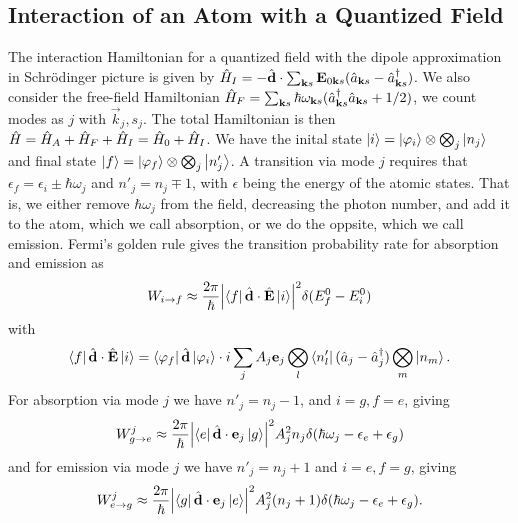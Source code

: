 \subsection{Interaction of an Atom with a Quantized Field} \label{sec:interaction_quantized}
The interaction Hamiltonian for a quantized field with the dipole approximation in Schrödinger picture is given by $\hat{H}_I = - \hat{\bm{\mathrm{d}}} \cdot \sum_{\bm{\mathrm{k}}s}\bm{\mathrm{E}}_{0 \bm{\mathrm{k}}s} (\hat{a}_{\bm{\mathrm{k}} s} - \hat{a}^\dagger_{\bm{\mathrm{k}} s})$. We also consider the free-field Hamiltonian $\hat{H}_F = \sum_{\bm{\mathrm{k}} s} \hbar\omega_{\bm{\mathrm{k}} s}(\hat{a}^\dagger_{\bm{\mathrm{k}} s}\hat{a}_{\bm{\mathrm{k}} s} + 1/2)$, we count modes as $j$ with $\vec{k}_j, s_j$. The total Hamiltonian is then $\hat{H} = \hat{H}_A + \hat{H}_F + \hat{H}_I = \hat{H}_0 + \hat{H}_I$. We have the inital state $\ket{i} = \ket{\varphi_i} \otimes \bigotimes_j \ket{n_j}$ and final state $\ket{f} = \ket{\varphi_f} \otimes \bigotimes_j \ket{n'_j}$. A transition via mode $j$ requires that $\epsilon_f = \epsilon_i \pm \hbar\omega_j$ and $n'_j = n_j \mp 1$, with $\epsilon$ being the energy of the atomic states. That is, we either remove $\hbar\omega_j$ from the field, decreasing the photon number, and add it to the atom, which we call absorption, or we do the oppsite, which we call emission. Fermi's golden rule gives the transition probability rate for absorption and emission as 
\begin{equation}
    W_{i \to f} \approx \frac{2\pi}{\hbar}\abs{\bra{f} \hat{\bm{\mathrm{d}}} \cdot \hat{\bm{\mathrm{E}}}\ket{i}}^2 \delta (E^0_f -E^0_i)
\end{equation}
with
\begin{equation}
    \bra{f} \dipole \cdot \hat{\vec E}\ket{i} = \bra{\varphi_f} \dipole\ket{\varphi_i} \cdot i \sum_j A_j \vec{e}_j \bigotimes_l\bra{n'_l} (\a_j - \ad_j)  \bigotimes_m\ket{n_m}.
\end{equation}
For absorption via mode $j$ we have $n'_j = n_j - 1$, and $i=g, f=e$, giving 
\begin{equation}
    W_{g\to e}^j \approx \frac{2\pi}{\hbar} \abs{\bra{e} \dipole \cdot \vec{e}_j \ket{g}}^2 A_j^2 n_j \delta(\hbar\omega_j - \epsilon_e + \epsilon_g)
\end{equation}
and for emission via mode $j$ we have $n'_j = n_j + 1$ and $i=e, f=g$, giving
\begin{equation}
    W_{e \to g}^j \approx \frac{2\pi}{\hbar} \abs{\bra{g} \dipole \cdot \vec{e}_j \ket{e}}^2 A_j^2 (n_j + 1) \delta(\hbar\omega_j - \epsilon_e + \epsilon_g).
\end{equation}
